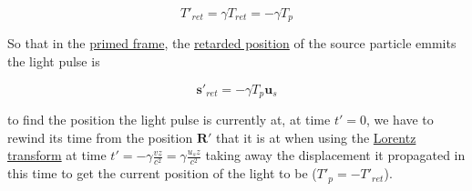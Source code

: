 \begin{equation}
	T'_{ret}= \gamma T_{ret} = - \gamma T_{p}
\end{equation}

So that in the \hyperlink{def-Primed-Frame}{primed frame}, the \hyperlink{def-retarded-position}{retarded position} of the source particle emmits the light pulse is

\begin{equation}
	\mathbf{s}'_{ret} = - \gamma T_{p} \mathbf{u}_s
\end{equation}

to find the position the light pulse is currently at, at time $t'=0$, we have to rewind its time from the position $\mathbf{R}'$ that it is at when using the \hyperlink{def-lorentz-transform}{Lorentz transform} at time $t'= -\gamma\frac{vz}{c^2}= \gamma\frac{u_s z}{c^2}$ taking away the displacement it propagated in this time to get the current position of the light to be ($T'_{p}=- T'_{ret}$).

